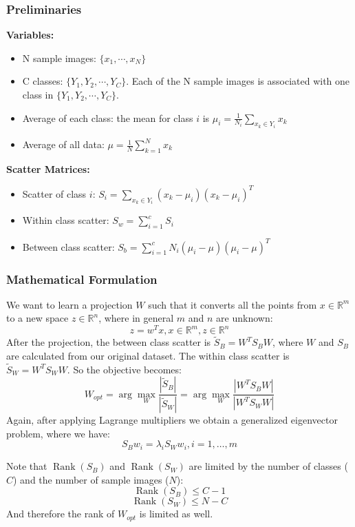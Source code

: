 \documentclass{article}
\newcommand{\argmax}{\arg\!\max}
\DeclareMathOperator{\Rank}{Rank}
\begin{document}
\subsubsection{Preliminaries}
\textbf{Variables:}
\begin{itemize}
	\item N sample images: $\{x_1, \cdots, x_N\}$
    \item C classes: $\{Y_1, Y_2, \cdots, Y_C\}$. Each of the N sample images is associated with one class in $\{Y_1, Y_2, \cdots, Y_C\}$.
    \item Average of each class: the mean for class $i$ is $\mu_i = \frac{1}{N_i} \displaystyle\sum_{x_k \in Y_i}x_k$ 
    \item Average of all data: $\mu = \frac{1}{N} \displaystyle\sum_{k=1}^{N}x_k$
\end{itemize}
\textbf{Scatter Matrices:}
\begin{itemize}
	\item Scatter of class $i$: $S_i = \displaystyle\sum_{x_k \in Y_i} (x_k - \mu_i)(x_k - \mu_i)^T$
    \item Within class scatter: $S_w = \displaystyle\sum_{i=1}^{c} S_i$
    \item Between class scatter: $S_b = \displaystyle\sum_{i=1}^{c} N_i(\mu_i-\mu)(\mu_i-\mu)^T$
\end{itemize}

\subsubsection{Mathematical Formulation}
We want to learn a projection $W$ such that it converts all the points from $x\in \mathbb{R}^m$ to a new space $z\in \mathbb{R}^n$, where in general $m$ and $n$ are unknown:
$$z = w^Tx, x\in \mathbb{R}^m, z\in \mathbb{R}^n$$
After the projection, the between class scatter is $\widetilde{S}_B = W^TS_BW$, where $W$ and $S_B$ are calculated from our original dataset. The within class scatter is $\widetilde{S}_W = W^TS_WW$. So the objective becomes: 
$$W_{opt} = \argmax_W \frac{\left|\widetilde{S}_B\right|}{\left|\widetilde{S}_W\right|} = \argmax_W \frac{\left|W^TS_BW\right|}{\left|W^TS_WW\right|}$$
Again, after applying Lagrange multipliers we obtain a generalized eigenvector problem, where we have:
$$S_B w_i = \lambda_iS_Ww_i, i = 1, \dots, m$$

Note that $\Rank(S_B)$ and $\Rank(S_W)$ are limited by the number of classes ($C$) and the number of sample images ($N$):
$$\Rank(S_B) \leq C-1$$
$$\Rank(S_W) \leq N-C$$
And therefore the rank of $W_{opt}$ is limited as well.
\end{document}
